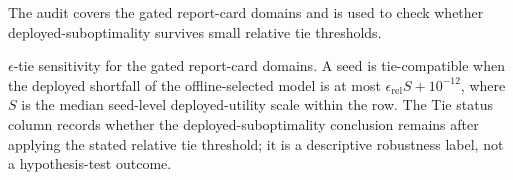 \documentclass{article}
\begin{document}
The audit covers the gated report-card domains and is used to check whether deployed-suboptimality survives small relative tie thresholds.

\begin{table}[H]
\caption{\(\epsilon\)-tie sensitivity for the gated report-card domains. A seed is tie-compatible when the deployed shortfall of the offline-selected model is at most \(\epsilon_{\mathrm{rel}}S + 10^{-12}\), where \(S\) is the median seed-level deployed-utility scale within the row. The Tie status column records whether the deployed-suboptimality conclusion remains after applying the stated relative tie threshold; it is a descriptive robustness label, not a hypothesis-test outcome.}
\label{tab:epsilon-tie-sensitivity}
\centering
\scriptsize
\setlength{\tabcolsep}{2.2pt}
\begin{adjustbox}{width=\appwidetablewidth}

\end{adjustbox}
\end{table}


\FloatBarrier
\end{document}
